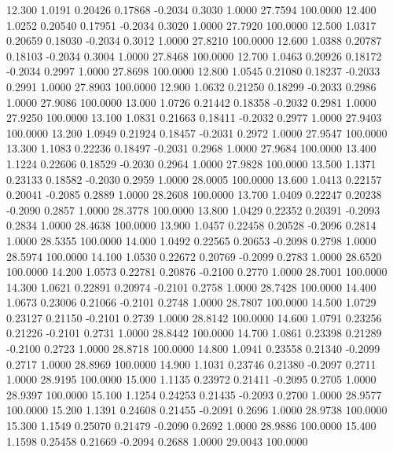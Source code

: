   12.300   1.0191   0.20426   0.17868  -0.2034   0.3030   1.0000  27.7594 100.0000
  12.400   1.0252   0.20540   0.17951  -0.2034   0.3020   1.0000  27.7920 100.0000
  12.500   1.0317   0.20659   0.18030  -0.2034   0.3012   1.0000  27.8210 100.0000
  12.600   1.0388   0.20787   0.18103  -0.2034   0.3004   1.0000  27.8468 100.0000
  12.700   1.0463   0.20926   0.18172  -0.2034   0.2997   1.0000  27.8698 100.0000
  12.800   1.0545   0.21080   0.18237  -0.2033   0.2991   1.0000  27.8903 100.0000
  12.900   1.0632   0.21250   0.18299  -0.2033   0.2986   1.0000  27.9086 100.0000
  13.000   1.0726   0.21442   0.18358  -0.2032   0.2981   1.0000  27.9250 100.0000
  13.100   1.0831   0.21663   0.18411  -0.2032   0.2977   1.0000  27.9403 100.0000
  13.200   1.0949   0.21924   0.18457  -0.2031   0.2972   1.0000  27.9547 100.0000
  13.300   1.1083   0.22236   0.18497  -0.2031   0.2968   1.0000  27.9684 100.0000
  13.400   1.1224   0.22606   0.18529  -0.2030   0.2964   1.0000  27.9828 100.0000
  13.500   1.1371   0.23133   0.18582  -0.2030   0.2959   1.0000  28.0005 100.0000
  13.600   1.0413   0.22157   0.20041  -0.2085   0.2889   1.0000  28.2608 100.0000
  13.700   1.0409   0.22247   0.20238  -0.2090   0.2857   1.0000  28.3778 100.0000
  13.800   1.0429   0.22352   0.20391  -0.2093   0.2834   1.0000  28.4638 100.0000
  13.900   1.0457   0.22458   0.20528  -0.2096   0.2814   1.0000  28.5355 100.0000
  14.000   1.0492   0.22565   0.20653  -0.2098   0.2798   1.0000  28.5974 100.0000
  14.100   1.0530   0.22672   0.20769  -0.2099   0.2783   1.0000  28.6520 100.0000
  14.200   1.0573   0.22781   0.20876  -0.2100   0.2770   1.0000  28.7001 100.0000
  14.300   1.0621   0.22891   0.20974  -0.2101   0.2758   1.0000  28.7428 100.0000
  14.400   1.0673   0.23006   0.21066  -0.2101   0.2748   1.0000  28.7807 100.0000
  14.500   1.0729   0.23127   0.21150  -0.2101   0.2739   1.0000  28.8142 100.0000
  14.600   1.0791   0.23256   0.21226  -0.2101   0.2731   1.0000  28.8442 100.0000
  14.700   1.0861   0.23398   0.21289  -0.2100   0.2723   1.0000  28.8718 100.0000
  14.800   1.0941   0.23558   0.21340  -0.2099   0.2717   1.0000  28.8969 100.0000
  14.900   1.1031   0.23746   0.21380  -0.2097   0.2711   1.0000  28.9195 100.0000
  15.000   1.1135   0.23972   0.21411  -0.2095   0.2705   1.0000  28.9397 100.0000
  15.100   1.1254   0.24253   0.21435  -0.2093   0.2700   1.0000  28.9577 100.0000
  15.200   1.1391   0.24608   0.21455  -0.2091   0.2696   1.0000  28.9738 100.0000
  15.300   1.1549   0.25070   0.21479  -0.2090   0.2692   1.0000  28.9886 100.0000
  15.400   1.1598   0.25458   0.21669  -0.2094   0.2688   1.0000  29.0043 100.0000
